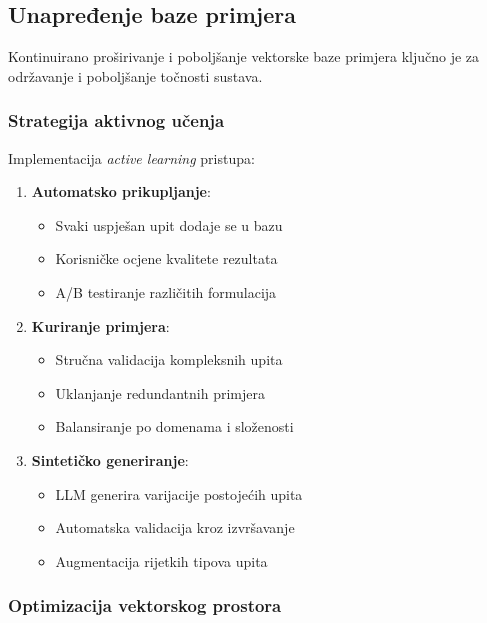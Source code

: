 \subsection{Unapređenje baze primjera}

Kontinuirano proširivanje i poboljšanje vektorske baze primjera ključno je za održavanje i poboljšanje točnosti sustava.

\subsubsection{Strategija aktivnog učenja}

Implementacija \textit{active learning} pristupa:

\begin{enumerate}
    \item \textbf{Automatsko prikupljanje}:
    \begin{itemize}
        \item Svaki uspješan upit dodaje se u bazu
        \item Korisničke ocjene kvalitete rezultata
        \item A/B testiranje različitih formulacija
    \end{itemize}
    
    \item \textbf{Kuriranje primjera}:
    \begin{itemize}
        \item Stručna validacija kompleksnih upita
        \item Uklanjanje redundantnih primjera
        \item Balansiranje po domenama i složenosti
    \end{itemize}
    
    \item \textbf{Sintetičko generiranje}:
    \begin{itemize}
        \item LLM generira varijacije postojećih upita
        \item Automatska validacija kroz izvršavanje
        \item Augmentacija rijetkih tipova upita
    \end{itemize}
\end{enumerate}

\subsubsection{Optimizacija vektorskog prostora}

